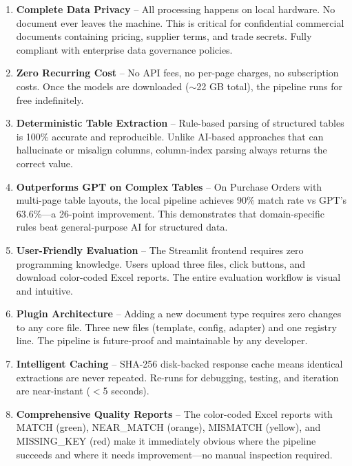 \documentclass[12pt,a4paper]{report}
\begin{document}
\begin{enumerate}[leftmargin=*]

    \item \textbf{Complete Data Privacy} -- All processing happens on local hardware. No document ever leaves the machine. This is critical for confidential commercial documents containing pricing, supplier terms, and trade secrets. Fully compliant with enterprise data governance policies.

    \item \textbf{Zero Recurring Cost} -- No API fees, no per-page charges, no subscription costs. Once the models are downloaded ($\sim$22 GB total), the pipeline runs for free indefinitely.

    \item \textbf{Deterministic Table Extraction} -- Rule-based parsing of structured tables is 100\% accurate and reproducible. Unlike AI-based approaches that can hallucinate or misalign columns, column-index parsing always returns the correct value.

    \item \textbf{Outperforms GPT on Complex Tables} -- On Purchase Orders with multi-page table layouts, the local pipeline achieves 90\% match rate vs GPT's 63.6\%---a 26-point improvement. This demonstrates that domain-specific rules beat general-purpose AI for structured data.

    \item \textbf{User-Friendly Evaluation} -- The Streamlit frontend requires zero programming knowledge. Users upload three files, click buttons, and download color-coded Excel reports. The entire evaluation workflow is visual and intuitive.

    \item \textbf{Plugin Architecture} -- Adding a new document type requires zero changes to any core file. Three new files (template, config, adapter) and one registry line. The pipeline is future-proof and maintainable by any developer.

    \item \textbf{Intelligent Caching} -- SHA-256 disk-backed response cache means identical extractions are never repeated. Re-runs for debugging, testing, and iteration are near-instant ($<$5 seconds).

    \item \textbf{Comprehensive Quality Reports} -- The color-coded Excel reports with MATCH (green), NEAR\_MATCH (orange), MISMATCH (yellow), and MISSING\_KEY (red) make it immediately obvious where the pipeline succeeds and where it needs improvement---no manual inspection required.

\end{enumerate}
\end{document}
